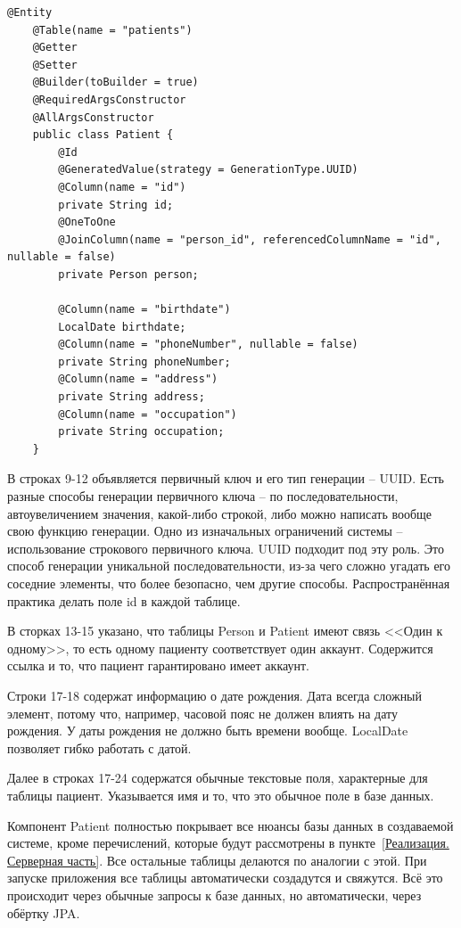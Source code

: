 \documentclass[a4paper,article]{article}
\begin{document}
    \newpage

    \begin{lstlisting}[label=jpapatient,caption=Пример реализации таблицы Patient через JPA]
    @Entity
    @Table(name = "patients")
    @Getter
    @Setter
    @Builder(toBuilder = true)
    @RequiredArgsConstructor
    @AllArgsConstructor
    public class Patient {
        @Id
        @GeneratedValue(strategy = GenerationType.UUID)
        @Column(name = "id")
        private String id;
        @OneToOne
        @JoinColumn(name = "person_id", referencedColumnName = "id", nullable = false)
        private Person person;

        @Column(name = "birthdate")
        LocalDate birthdate;
        @Column(name = "phoneNumber", nullable = false)
        private String phoneNumber;
        @Column(name = "address")
        private String address;
        @Column(name = "occupation")
        private String occupation;
    }
    \end{lstlisting}

    В строках 9-12 объявляется первичный ключ и его тип генерации -- UUID. Есть разные способы генерации первичного ключа -- по последовательности, автоувеличением значения, какой-либо строкой, либо можно написать вообще свою функцию генерации. Одно из изначальных ограничений системы -- использование строкового первичного ключа. UUID подходит под эту роль. Это способ генерации уникальной последовательности, из-за чего сложно угадать его соседние элементы, что более безопасно, чем другие способы. Распространённая практика делать поле id в каждой таблице.

    В сторках 13-15 указано, что таблицы Person и Patient имеют связь <<Один к одному>>, то есть одному пациенту соответствует один аккаунт. Содержится ссылка и то, что пациент гарантировано имеет аккаунт.

    Строки 17-18 содержат информацию о дате рождения. Дата всегда сложный элемент, потому что, например, часовой пояс не должен влиять на дату рождения. У даты рождения не должно быть времени вообще. LocalDate позволяет гибко работать с датой.

    Далее в строках 17-24 содержатся обычные текстовые поля, характерные для таблицы пациент. Указывается имя и то, что это обычное поле в базе данных.

    Компонент Patient полностью покрывает все нюансы базы данных в создаваемой системе, кроме перечислений, которые будут рассмотрены в пункте~\ref{Реализация. Серверная часть}. Все остальные таблицы делаются по аналогии с этой. При запуске приложения все таблицы автоматически создадутся и свяжутся. Всё это происходит через обычные запросы к базе данных, но автоматически, через обёртку JPA.
\end{document}
